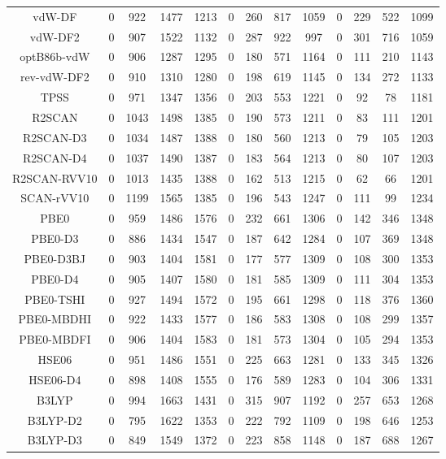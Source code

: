 \begin{table}[ht]
\begin{tabular}{ccccccccccccc}
vdW-DF & 0 & 922 & 1477 & 1213 & 0 & 260 & 817 & 1059 & 0 & 229 & 522 & 1099 \\ 
vdW-DF2 & 0 & 907 & 1522 & 1132 & 0 & 287 & 922 & 997 & 0 & 301 & 716 & 1059 \\ 
optB86b-vdW & 0 & 906 & 1287 & 1295 & 0 & 180 & 571 & 1164 & 0 & 111 & 210 & 1143 \\ 
rev-vdW-DF2 & 0 & 910 & 1310 & 1280 & 0 & 198 & 619 & 1145 & 0 & 134 & 272 & 1133 \\ 
TPSS & 0 & 971 & 1347 & 1356 & 0 & 203 & 553 & 1221 & 0 & 92 & 78 & 1181 \\ 
R2SCAN & 0 & 1043 & 1498 & 1385 & 0 & 190 & 573 & 1211 & 0 & 83 & 111 & 1201 \\ 
R2SCAN-D3 & 0 & 1034 & 1487 & 1388 & 0 & 180 & 560 & 1213 & 0 & 79 & 105 & 1203 \\ 
R2SCAN-D4 & 0 & 1037 & 1490 & 1387 & 0 & 183 & 564 & 1213 & 0 & 80 & 107 & 1203 \\ 
R2SCAN-RVV10 & 0 & 1013 & 1435 & 1388 & 0 & 162 & 513 & 1215 & 0 & 62 & 66 & 1201 \\ 
SCAN-rVV10 & 0 & 1199 & 1565 & 1385 & 0 & 196 & 543 & 1247 & 0 & 111 & 99 & 1234 \\ 
PBE0 & 0 & 959 & 1486 & 1576 & 0 & 232 & 661 & 1306 & 0 & 142 & 346 & 1348 \\ 
PBE0-D3 & 0 & 886 & 1434 & 1547 & 0 & 187 & 642 & 1284 & 0 & 107 & 369 & 1348 \\ 
PBE0-D3BJ & 0 & 903 & 1404 & 1581 & 0 & 177 & 577 & 1309 & 0 & 108 & 300 & 1353 \\ 
PBE0-D4 & 0 & 905 & 1407 & 1580 & 0 & 181 & 585 & 1309 & 0 & 111 & 304 & 1353 \\ 
PBE0-TSHI & 0 & 927 & 1494 & 1572 & 0 & 195 & 661 & 1298 & 0 & 118 & 376 & 1360 \\ 
PBE0-MBDHI & 0 & 922 & 1433 & 1577 & 0 & 186 & 583 & 1308 & 0 & 108 & 299 & 1357 \\ 
PBE0-MBDFI & 0 & 906 & 1404 & 1583 & 0 & 181 & 573 & 1304 & 0 & 105 & 294 & 1353 \\ 
HSE06 & 0 & 951 & 1486 & 1551 & 0 & 225 & 663 & 1281 & 0 & 133 & 345 & 1326 \\ 
HSE06-D4 & 0 & 898 & 1408 & 1555 & 0 & 176 & 589 & 1283 & 0 & 104 & 306 & 1331 \\ 
B3LYP & 0 & 994 & 1663 & 1431 & 0 & 315 & 907 & 1192 & 0 & 257 & 653 & 1268 \\ 
B3LYP-D2 & 0 & 795 & 1622 & 1353 & 0 & 222 & 792 & 1109 & 0 & 198 & 646 & 1253 \\ 
B3LYP-D3 & 0 & 849 & 1549 & 1372 & 0 & 223 & 858 & 1148 & 0 & 187 & 688 & 1267 \\ 

\end{tabular}
\end{table}
